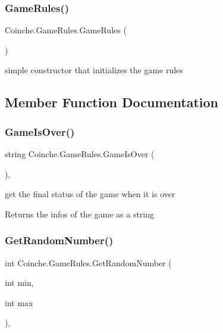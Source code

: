 \subsubsection{\texorpdfstring{Game\+Rules()}{GameRules()}}
{\footnotesize\ttfamily Coinche.\+Game\+Rules.\+Game\+Rules (\begin{DoxyParamCaption}{ }\end{DoxyParamCaption})\hspace{0.3cm}{\ttfamily [inline]}}



simple constructor that initializes the game rules 



\subsection{Member Function Documentation}
\mbox{\label{class_coinche_1_1_game_rules_a5cb1f456d58d7cf34640b8a5f8cf0c78}} 
\subsubsection{\texorpdfstring{Game\+Is\+Over()}{GameIsOver()}}
{\footnotesize\ttfamily string Coinche.\+Game\+Rules.\+Game\+Is\+Over (\begin{DoxyParamCaption}{ }\end{DoxyParamCaption})\hspace{0.3cm}{\ttfamily [inline]}, {\ttfamily [private]}}



get the final status of the game when it is over 

\begin{DoxyReturn}{Returns}
the infos of the game as a string
\end{DoxyReturn}
\mbox{\label{class_coinche_1_1_game_rules_a736a9ad94effcbe64f0d23b1d752d26c}} 
\subsubsection{\texorpdfstring{Get\+Random\+Number()}{GetRandomNumber()}}
{\footnotesize\ttfamily int Coinche.\+Game\+Rules.\+Get\+Random\+Number (\begin{DoxyParamCaption}\item[{int}]{min,  }\item[{int}]{max }\end{DoxyParamCaption})\hspace{0.3cm}{\ttfamily [inline]}, {\ttfamily [private]}}



